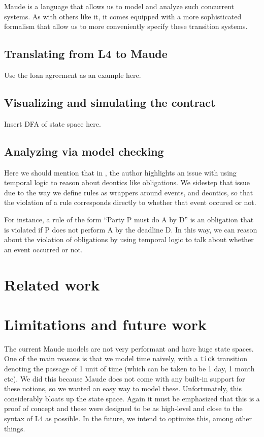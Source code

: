 \documentclass{article}
\begin{document}
Maude is a language that allows us to model and analyze such concurrent systems.
As with others like it, it comes equipped with a more sophisticated formalism
that allow us to more conveniently specify these transition systems.

\subsection{Translating from L4 to Maude}
Use the loan agreement as an example here.

\subsection{Visualizing and simulating the contract}
Insert DFA of state space here.

\subsection{Analyzing via model checking}
Here we should mention that in \cite{temporal_logic_norms_guido}, the author
highlights an issue with using temporal logic to reason about deontics like
obligations.
We sidestep that issue due to the way we define rules as wrappers around
events, and deontics, so that the violation of a rule corresponds directly to
whether that event occured or not.

For instance, a rule of the form ``Party P must do A by D'' is an obligation
that is violated if P does not perform A by the deadline D.
In this way, we can reason about the violation of obligations by using
temporal logic to talk about whether an event occurred or not.

\section{Related work}

\section{Limitations and future work}
The current Maude models are not very performant and have huge state spaces.
One of the main reasons is that we model time naively, with a \texttt{tick}
transition denoting the passage of 1 unit of time (which can be taken to be
1 day, 1 month etc).
We did this because Maude does not come with any built-in support for these notions,
so we wanted an easy way to model these.
Unfortunately, this considerably bloats up the state space.
Again it must be emphasized that this is a proof of concept and these were
designed to be as high-level and close to the syntax of L4 as possible.
In the future, we intend to optimize this, among other things.
\end{document}
